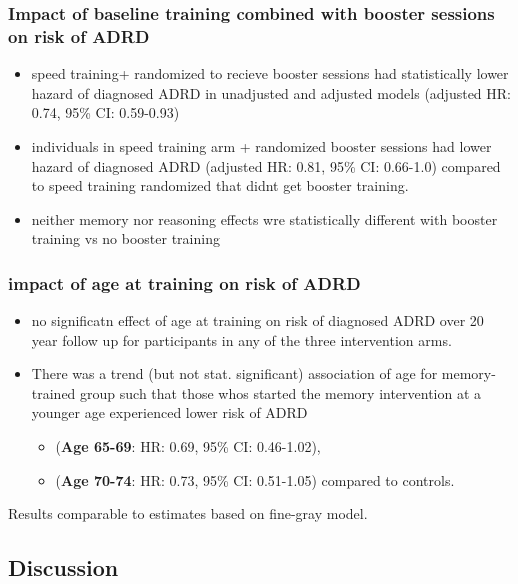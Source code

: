 \documentclass[11pt]{article}
\begin{document}
\subsubsection{Impact of baseline training combined with booster sessions on risk of ADRD}
\label{sec:org389be5a}
\begin{itemize}
\item speed training+ randomized to recieve booster sessions had statistically lower hazard of diagnosed ADRD in unadjusted and adjusted models (adjusted HR: 0.74, 95\% CI: 0.59-0.93)
\item individuals in speed training arm + randomized booster sessions had lower hazard of diagnosed ADRD (adjusted HR: 0.81, 95\% CI: 0.66-1.0) compared to speed training randomized that didnt get booster training.
\item neither memory nor reasoning effects wre statistically different with booster training vs no booster training
\end{itemize}

\subsubsection{impact of age at training on risk of ADRD}
\label{sec:orgbc2eebc}

\begin{itemize}
\item no significatn effect of age at training on risk of diagnosed ADRD over 20 year follow up for participants in any of the three intervention arms.
\item There was a trend (but not stat. significant) association of age for memory-trained group such that those whos started the memory intervention at a younger age experienced lower risk of ADRD
\begin{itemize}
\item (\textbf{\textbf{Age 65-69}}: HR: 0.69, 95\% CI: 0.46-1.02),
\item (\textbf{\textbf{Age 70-74}}: HR: 0.73, 95\% CI: 0.51-1.05) compared to controls.
\end{itemize}
\end{itemize}

Results comparable to estimates based on fine-gray model.

\subsection{Discussion}
\label{sec:org68c6940}
\end{document}
